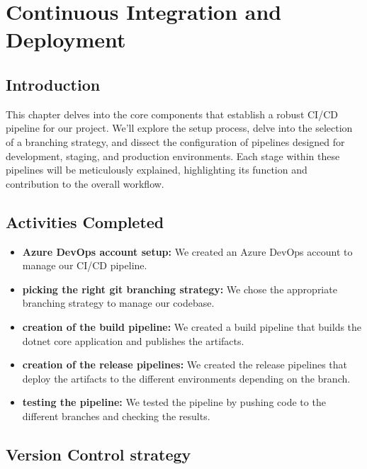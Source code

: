 \chapter{Continuous Integration and Deployment}

\section*{Introduction}
This chapter delves into the core components that establish a robust CI/CD pipeline for our project. We'll explore the setup process, delve into the selection of a branching strategy, and dissect the configuration of pipelines designed for development, staging, and production environments. Each stage within these pipelines will be meticulously explained, highlighting its function and contribution to the overall workflow.
\section{Activities Completed}
\begin{itemize}
    \item \textbf{Azure DevOps account setup:} We created an Azure DevOps account to manage our CI/CD pipeline.
    \item \textbf{picking the right git branching strategy:} We chose the appropriate branching strategy to manage our codebase.
    \item \textbf{creation of the build pipeline:} We created a build pipeline that builds the dotnet core application and publishes the artifacts.
    \item \textbf{creation of the release pipelines:} We created the release pipelines that deploy the artifacts to the different environments depending on the branch.
    \item \textbf{testing the pipeline:} We tested the pipeline by pushing code to the different branches and checking the results.
\end{itemize}

\section{Version Control strategy}
